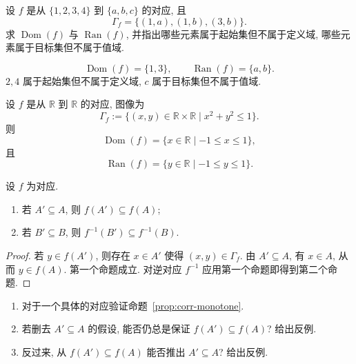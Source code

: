 \documentclass[usesamecnt, thmcnt=section, lang=cn, newtx, 10pt, scheme=chinese]{elegantbook}
\begin{document}
\begin{concept}\label{con:corr-05}
设 $f$ 是从 $\{1,2,3,4\}$ 到 $\{a,b,c\}$ 的对应, 且
\[
 \Gamma_f=\{(1,a),(1,b),(3,b)\}.
\]
求 $\operatorname{Dom}(f)$ 与 $\operatorname{Ran}(f)$, 并指出哪些元素属于起始集但不属于定义域, 哪些元素属于目标集但不属于值域.
\end{concept}

\begin{solution}
\[
 \operatorname{Dom}(f)=\{1,3\},\qquad
 \operatorname{Ran}(f)=\{a,b\}.
\]
$2,4$ 属于起始集但不属于定义域, $c$ 属于目标集但不属于值域.
\end{solution}

\begin{instance}
设 $f$ 是从 $\mathbb R$ 到 $\mathbb R$ 的对应, 图像为
\[
 \Gamma_f:=\{(x,y)\in\mathbb R\times\mathbb R\mid x^2+y^2\leq1\}.
\]
则
\[
 \operatorname{Dom}(f)=\{x\in\mathbb R\mid -1\leq x\leq1\},
\]
且
\[
 \operatorname{Ran}(f)=\{y\in\mathbb R\mid -1\leq y\leq1\}.
\]
\end{instance}

\begin{proposition}\label{prop:corr-monotone}
设 $f$ 为对应.
\begin{enumerate}[label=\rm(\arabic*)]
  \item 若 $A'\subseteq A$, 则 $f(A')\subseteq f(A)$;
  \item 若 $B'\subseteq B$, 则 $f^{-1}(B')\subseteq f^{-1}(B)$.
\end{enumerate}
\end{proposition}

\begin{proof}
若 $y\in f(A')$, 则存在 $x\in A'$ 使得 $(x,y)\in\Gamma_f$. 由 $A'\subseteq A$, 有 $x\in A$, 从而 $y\in f(A)$. 第一个命题成立. 对逆对应 $f^{-1}$ 应用第一个命题即得到第二个命题.
\end{proof}

\begin{exercise}\label{ex:corr-monotone}
\begin{enumerate}[label=\rm(\arabic*)]
  \item 对于一个具体的对应验证命题~\ref{prop:corr-monotone}.
  \item 若删去 $A'\subseteq A$ 的假设, 能否仍总是保证 $f(A')\subseteq f(A)$? 给出反例.
  \item 反过来, 从 $f(A')\subseteq f(A)$ 能否推出 $A'\subseteq A$? 给出反例.
\end{enumerate}
\end{exercise}
\end{document}
